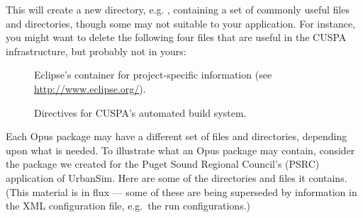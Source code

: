 This will create a new directory, e.g. ,
containing a set of commonly useful files and directories, though some may not
suitable to your application. For instance, you might want to delete the
following four files that are useful in the CUSPA infrastructure,
but probably not in yours:

\begin{description}

\item[]  
Eclipse's
container for project-specific information (see \url{http://www.eclipse.org/}).

\item[]
Directives for CUSPA's automated build system.

\end{description}

Each Opus package may have a different set of files and directories, depending
upon what is needed. To illustrate what an Opus package may contain, consider
the  package we created for the Puget Sound Regional
Council's (PSRC) application
of UrbanSim.  Here are some of the directories and files it contains.  (This
material is in flux --- some
of these are being superseded by information in the XML configuration file, e.g.\
the run configurations.)


